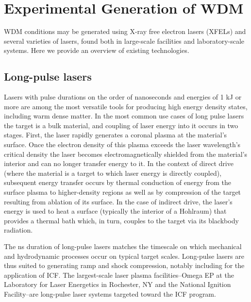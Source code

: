 \documentclass [11pt, proquest, article] {uwthesis}[2016/11/22]
\begin{document}
\section{Experimental Generation of WDM}
WDM conditions may be generated using X-ray free electron lasers (XFELs) and several varieties of lasers, found both in large-scale facilities and laboratory-scale systems. Here we provide an overview of existing technologies. 
\subsection{Long-pulse lasers}
Lasers with pulse durations on the order of nanoseconds and energies of 1 kJ or more are among the most versatile tools for producing high energy density states, including warm dense matter. In the most common use cases of long pulse lasers the target is a bulk material, and coupling of laser energy into it occurs in two stages. First, the laser rapidly  generates a coronal plasma at the material's surface. Once the electron density of this plasma exceeds the laser wavelength's critical density  the laser becomes electromagnetically shielded from the material's interior and can no longer transfer energy to it. In the context of direct drive (where the material is a target to which laser energy is directly coupled), subsequent energy transfer occurs by thermal conduction of energy from the surface plasma to higher-density regions as well as by compression of the target resulting from ablation of its surface. In the case of indirect drive, the laser's energy is used to heat a surface (typically the interior of a Hohlraum) that provides a thermal bath which, in turn, couples to the target via its blackbody radiation. 

The ns duration of long-pulse lasers matches the timescale on which mechanical and hydrodynamic processes occur on typical target scales. Long-pulse lasers are thus suited to generating ramp and shock compression, notably including for the application of ICF. The largest-scale laser plasma facilities--Omega EP at the Laboratory for Laser Energetics in Rochester, NY and the National Ignition Facility--are long-pulse laser systems targeted toward the ICF program.

\end{document}
